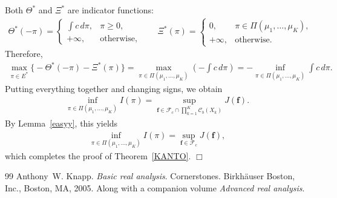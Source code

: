 \documentclass[10pt,a4paper]{amsart}
\theoremstyle{plain}
\theoremstyle{definition}
\theoremstyle{remark}
\begin{document}
Both \(\Theta^{\ast}\) and \(\Xi^{\ast}\) are indicator functions:
\begin{align*}
\Theta^{\ast}(-\pi)=
\begin{cases}
\int c\, d\pi, & \pi\ge 0,\\[0.2em]
+\infty, & \text{otherwise},
\end{cases}
\qquad
\Xi^{\ast}(\pi)=
\begin{cases}
0, & \pi\in\Pi(\mu_{1},\ldots,\mu_{K}),\\[0.2em]
+\infty, & \text{otherwise}.
\end{cases}
\end{align*}
Therefore,
\begin{align*}
\max_{\pi\in E^{\ast}}
\big\{
-\Theta^{\ast}(-\pi)-\Xi^{\ast}(\pi)
\big\}
=
\max_{\pi\in\Pi(\mu_{1},\ldots,\mu_{K})}
\left(
-\int c\, d\pi
\right)
=
-\inf_{\pi\in\Pi(\mu_{1},\ldots,\mu_{K})}
\int c\, d\pi.
\end{align*}
Putting everything together and changing signs, we obtain
\begin{align*}
\inf_{\pi\in\Pi(\mu_{1},\ldots,\mu_{K})} I(\pi)
=
\sup_{\boldsymbol{f}\in \mathcal{F}_{c}\cap\prod_{k=1}^{K}\mathcal{C}_{b}(X_{k})}
J(\boldsymbol{f}).
\end{align*}
By Lemma~\ref{easyy}, this yields
\begin{align*}
\inf_{\pi\in\Pi(\mu_1,\ldots,\mu_K)} I(\pi)
=
\sup_{\boldsymbol f\in \mathcal F_c} J(\boldsymbol f),
\end{align*}
which completes the proof of Theorem~\ref{KANTO}.
\hfill\(\Box\)

\begin{thebibliography}{99}
 Anthony~W. Knapp. {\em Basic real analysis}. Cornerstones. Birkh\"{a}user Boston, Inc., Boston, MA, 2005. Along with a companion volume {\it Advanced real analysis}.
\end{thebibliography}
\end{document}
